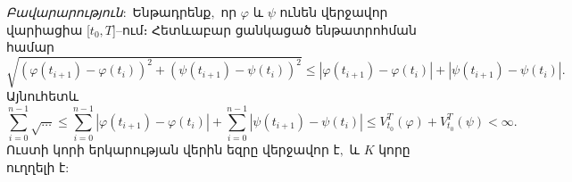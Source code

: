 \documentclass[12pt]{article}
\begin{document}
\textit{Բավարարություն\(:\)} Ենթադրենք\(,\) որ \(\varphi\) և \(\psi\) ունեն վերջավոր վարիացիա [\(t_0,T\)]–ում։ Հետևաբար ցանկացած ենթատրոհման համար
\[
\sqrt{(\varphi(t_{i+1})-\varphi(t_i))^2+(\psi(t_{i+1})-\psi(t_i))^2} \le
|\varphi(t_{i+1})-\varphi(t_i)| + |\psi(t_{i+1})-\psi(t_i)|.
\]
Այնուհետև
\[
\sum_{i=0}^{n-1}\sqrt{\dots} \le \sum_{i=0}^{n-1}|\varphi(t_{i+1})-\varphi(t_i)| + \sum_{i=0}^{n-1}|\psi(t_{i+1})-\psi(t_i)|
\le V_{t_0}^T(\varphi) + V_{t_0}^T(\psi) < \infty.
\]
Ուստի կորի երկարության վերին եզրը վերջավոր է\(,\) և \(K\) կորը ուղղելի է\(:\)
\end{document}
